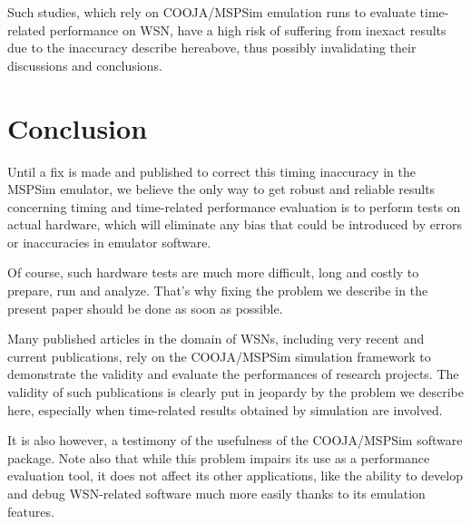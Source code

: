 \documentclass[a4paper,10pt]{article}
\begin{document}
Such studies, which rely on COOJA/MSPSim emulation runs to evaluate
time-related performance on WSN, have a high risk of suffering from
inexact results due to the inaccuracy describe hereabove, thus
possibly invalidating their discussions and conclusions.



\section{Conclusion}

Until a fix is made and published to correct this timing inaccuracy
in the MSPSim emulator, we believe the only way to get robust and reliable
results concerning timing and time-related performance evaluation is
to perform tests on actual hardware, which will eliminate any bias
that could be introduced by errors or inaccuracies in emulator software.

Of course, such hardware tests are much more difficult, long and
costly to prepare, run and analyze. That's why fixing the problem
we describe in the present paper should be done as soon as possible.

Many published articles in the domain of WSNs, including very recent
and current publications, rely on the COOJA/MSPSim simulation framework
to demonstrate the validity and evaluate the performances of research
projects. The validity of such publications is clearly put in jeopardy
by the problem we describe here, especially when time-related results
obtained by simulation are involved.

It is also however, a testimony of the usefulness of the COOJA/MSPSim
software package. Note also that while this problem impairs its use
as a performance evaluation tool, it does not affect its other applications,
like the ability to develop and debug WSN-related software much more easily
thanks to its emulation features.



\vfill

{\small
}
\end{document}
